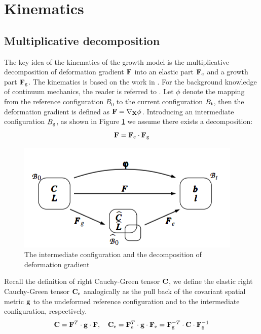 \section{Kinematics}
\subsection{Multiplicative decomposition}
The key idea of the kinematics of the growth model is the multiplicative decomposition of deformation gradient $\bold{F}$ into an elastic part $\bold{F}_{\mathrm{e}}$ and a growth part $\bold{F}_{\mathrm{g}}$. The kinematics is based on the work in \cite{Himpel, Goktepe2}. For the background knowledge of continuum mechanics, the reader is referred to \cite{Holzapfel}. Let $\phi$ denote the mapping from the reference configuration $B_0$ to the current configuration $B_{\mathrm{t}}$, then the deformation gradient is defined as $\bold{F} = \nabla_{\bold{X}} \phi$. Introducing an intermediate configuration $B_{\mathrm{g}}$, as shown in Figure \ref{fig:decomposition} we assume there exists a decomposition:
\begin{equation} \label{eq:decomposition}
\bold{F} = \bold{F}_{\mathrm{e}} \cdot \bold{F}_{\mathrm{g}}
\end{equation}

\begin{figure}[H]
   \centering
   \includegraphics[width=.5\textwidth]{./figures/decomposition.png} %
   \caption{The intermediate configuration and the decomposition of deformation gradient}
   \label{fig:decomposition}
\end{figure}

Recall the definition of right Cauchy-Green tensor $\bold{C}$, we define the elastic right Cauchy-Green tensor $\bold{C}_{\mathrm{e}}$ analogically as the pull back of the covariant spatial metric $\bold{g}$ to the undeformed reference configuration and to the intermediate configuration, respectively.
\begin{equation}
\bold{C} = \bold{F}^T \cdot \bold{g} \cdot \bold{F}, \quad \bold{C}_{\mathrm{e}} = \bold{F}_{\mathrm{e}}^T \cdot \bold{g} \cdot \bold{F}_{\mathrm{e}}
=  \bold{F}_{\mathrm{g}}^{-T} \cdot \bold{C} \cdot \bold{F}_{\mathrm{g}}^{-1}
\end{equation}

